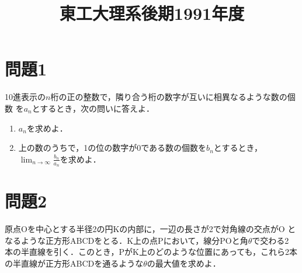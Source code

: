 \documentclass[unicode,12pt, a4paper]{ltjsarticle}%
\title{東工大理系後期1991年度}
\begin{document}
\maketitle
\section{問題1}
10進表示の$n$桁の正の整数で，隣り合う桁の数字が互いに相異なるような数の個数 を$a_n$とするとき，次の問いに答えよ．
    \begin{enumerate}
        \item $a_n$を求めよ．
        \item 上の数のうちで，1の位の数字が0である数の個数を$b_n$とするとき，$ \lim_{n \to \infty} \frac{b_n}{a_n}$を求めよ．
    \end{enumerate}

\section{問題2}
原点Oを中心とする半径2の円Kの内部に，一辺の長さが2で対角線の交点がO となるような正方形ABCDをとる．K上の点Pにおいて，線分POと角$\theta$で交わる2 本の半直線を引く．このとき，PがK上のどのような位置にあっても，これら2本の半直線が正方形ABCDを通るような$\theta$の最大値を求めよ．
\end{document}
